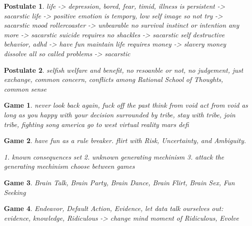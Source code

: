 \documentclass{article}
\newtheorem{postulate}{Postulate}
\newtheorem{game}{Game}
\begin{document}
\begin{postulate}
    life -> depression, bored, fear, timid, illness is persistent -> sacarstic
    life -> positive emotion is tempory, low self image so not  try -> sacarstic
    mood rollercoaster -> unbearable
    no survival instinct or intention any more -> sacarstic
    suicide requires no shackles -> sacarstic
    self destructive behavior, adhd -> have fun
    maintain life requires money -> slavery
    money dissolve all so called problems -> sacarstic
\end{postulate}

\begin{postulate}
    selfish welfare and benefit,
    no resoanble or not,
    no  judgement,
    just exchange,
    common concern,
    conflicts among {Rational School of Thoughts, common sense}
\end{postulate}

\begin{game}
    never look back again, fuck off the past
    think from void
    act from void
    as long as you happy with your decision
    surrounded by tribe, stay with tribe, join tribe, fighting song
    america
    go to west
    virtual reality
    mars
    defi
\end{game}

\begin{game}
    have fun as a rule breaker.
    flirt with Risk, Uncertainty, and Ambiguity.

    1. known {consequences set}
    2. unknown generating mechinism
    3. attack the generating mechinism
        choose between games
\end{game}

\begin{game}
    Brain Talk,
    Brain Party,
    Brain Dance,
    Brain Flirt,
    Brain Sex,
    Fun Seeking
\end{game}

\begin{game}
    Endeavor,
    Default Action,
    Evidence,
    let data talk ourselves out:  evidence, knowledge, Ridiculous -> change mind
    moment of Ridiculous,
    Evolve
\end{game}
\end{document}
